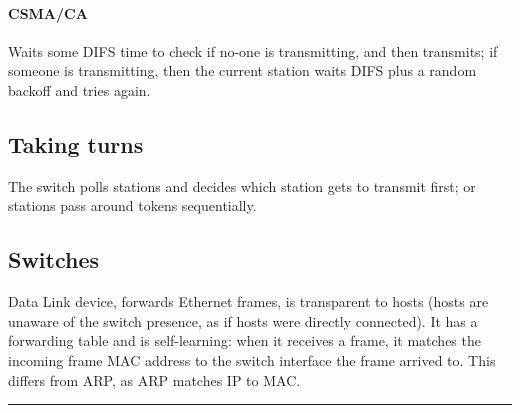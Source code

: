 \documentclass{form}
\begin{document}
\begin{multicols}{3}
    \paragraph{CSMA/CA} 
    Waits some DIFS time to check if no-one is transmitting, and then transmits; if someone is transmitting, then the current station waits DIFS plus a random backoff and tries again.

    \subsection*{Taking turns}
    The switch polls stations and decides which station gets to transmit first; or stations pass around tokens sequentially.

    \subsection*{Switches}
    Data Link device, forwards Ethernet frames, is transparent to hosts (hosts are unaware of the switch presence, as if hosts were directly connected). It has a forwarding table and is self-learning: when it receives a frame, it matches the incoming frame MAC address to the switch interface the frame arrived to. This differs from ARP, as ARP matches IP to MAC.
\end{multicols}

\vspace{-1.5em}\rule{\textwidth}{1.0pt}\vspace{-1.0em}
\end{document}
